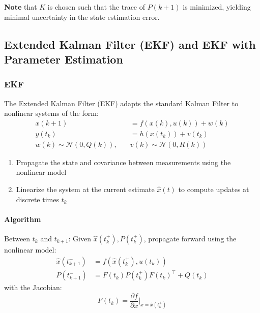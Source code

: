 \textbf{Note} that $K$ is chosen such that the trace of $P(k+1)$ is minimized, yielding minimal uncertainty in the state estimation error.

\subsection{Extended Kalman Filter (EKF) and EKF with Parameter Estimation}
\subsubsection{EKF}

The Extended Kalman Filter (EKF) adapts the standard Kalman Filter to nonlinear systems of the form:
\begin{align*}
    x(k+1)                               & = f(x(k), u(k)) + w(k)         \\
    y(t_k)                               & = h(x(t_k)) + v(t_k)           \\
    w(k) \sim \mathcal{N}(0, Q(k)),\quad & v(k) \sim \mathcal{N}(0, R(k))
\end{align*}

\newpar{}

\begin{enumerate}
    \item Propagate the state and covariance between measurements using the nonlinear model
    \item Linearize the system at the current estimate $\hat{x}(t)$ to compute updates at discrete times $t_k$
\end{enumerate}

\paragraph{Algorithm}

\newpar{}

Between $t_k$ and $t_{k+1}$: Given $\hat{x}(t_k^+), P(t_k^+)$, propagate forward using the nonlinear model:
\begin{align*}
    \hat{x}(t_{k+1}^-) & = f(\hat{x}(t_k^+), u(t_k))            \\
    P(t_{k+1}^-)       & = F(t_k) P(t_k^+) F(t_k)^\top + Q(t_k)
\end{align*}
with the Jacobian:
\begin{equation*}
    F(t_k) = \frac{\partial f}{\partial x} \bigg|_{x = \hat{x}(t_k^+)}
\end{equation*}

